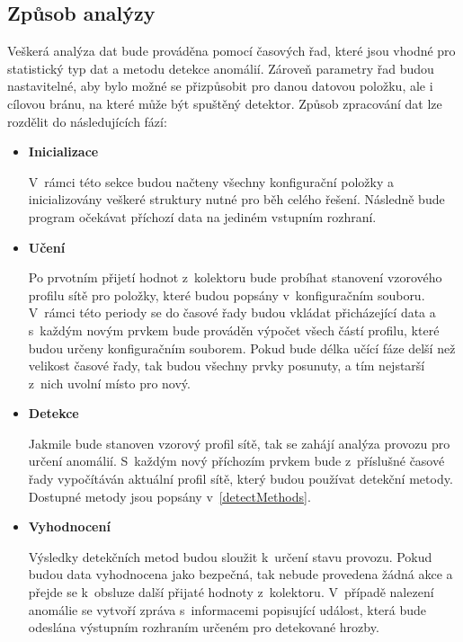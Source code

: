  
 \subsection{Způsob analýzy}
 Veškerá analýza dat bude prováděna pomocí časových řad, které jsou vhodné pro statistický typ 
 dat a metodu detekce anomálií. Zároveň parametry řad budou nastavitelné, aby bylo možné se přizpůsobit
 pro danou datovou položku, ale i cílovou bránu, na které může být spuštěný detektor. Způsob 
 zpracování dat lze rozdělit do následujících fází:
  \begin{itemize}
   \item \textbf{Inicializace}
   
   V~rámci této sekce budou načteny všechny konfigurační položky a inicializovány veškeré struktury
   nutné pro běh celého řešení. Následně bude program očekávat příchozí data na jediném vstupním
   rozhraní.
   
   \item \textbf{Učení}
   
   Po prvotním přijetí hodnot z~kolektoru bude probíhat stanovení vzorového profilu sítě pro položky,
   které budou popsány v~konfiguračním souboru. V~rámci
   této periody se do časové řady budou vkládat přicházející data a s~každým novým prvkem 
   bude prováděn výpočet všech částí profilu, které budou určeny konfiguračním souborem.
   Pokud bude délka učící fáze delší než velikost 
   časové řady, tak budou všechny prvky posunuty, a tím nejstarší z~nich uvolní místo pro nový.
   
   \item \textbf{Detekce}
   
   Jakmile bude stanoven vzorový profil sítě, tak se zahájí analýza provozu pro určení anomálií.
   S~každým nový příchozím prvkem bude z~příslušné časové řady vypočítáván aktuální profil sítě,
   který budou používat detekční metody. Dostupné metody jsou popsány v~\ref{detectMethods}.
   
   \newpage
   \item \textbf{Vyhodnocení}
   
   Výsledky detekčních metod budou sloužit k~určení stavu provozu. Pokud budou data vyhodnocena jako
   bezpečná, tak nebude provedena žádná akce a přejde se k~obsluze další přijaté hodnoty z~kolektoru.
   V~případě nalezení anomálie se vytvoří zpráva s~informacemi popisující událost, která bude 
   odeslána výstupním rozhraním určeném pro detekované hrozby.   
  \end{itemize}
  
